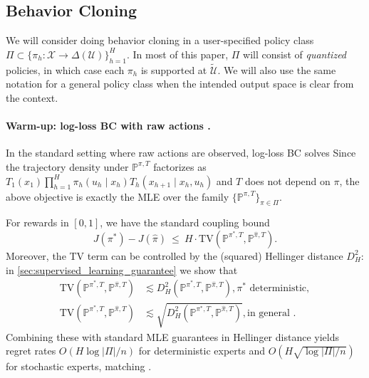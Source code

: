 \documentclass{article}
\newcommand{\arxiv}[1]{\iftoggle{icml}{}{#1}}
\newcommand{\icml}[1]{\iftoggle{icml}{#1}{}}
\let\oldparagraph\paragraph
\renewcommand{\paragraph}[1]{\oldparagraph{#1.}}
\begin{document}
\subsection{Behavior Cloning}\label{sec:bc_intro}
We will consider doing behavior cloning in a user-specified policy class $\Pi \subset \{\pi_h:\mathcal X \to \Delta(\mathcal U)\}_{h=1}^H$. In most of this paper, $\Pi$ will consist of \emph{quantized} policies, in which case each $\pi_h$ is supported at $\tilde {\mathcal U}$. We will also use the same notation for a general policy class when the intended output space is clear from the context.
\paragraph{Warm-up: log-loss BC with raw actions \citep{foster2024behavior}}
In the standard setting where raw actions are observed, log-loss BC solves
\icml{
\begin{align*}
    \hat\pi &\in \argmax_{\pi\in\Pi}\sum_{i=1}^n\sum_{h=1}^H \log \pi_h(u_h^i\mid x_h^i),\\&\{x_{1:H+1}^i,u_{1:H}^i\}_{i=1}^n \sim \mathbb P^{\pi^*,T}.
\end{align*}
}
\arxiv{
\begin{equation*}
    \hat\pi \in \argmax_{\pi\in\Pi}\sum_{i=1}^n\sum_{h=1}^H \log \pi_h(u_h^i\mid x_h^i), \{x_{1:H+1}^i,u_{1:H}^i\}_{i=1}^n \sim \mathbb P^{\pi^*,T}.
\end{equation*}
}
Since the trajectory density under $\mathbb P^{\pi,T}$ factorizes as
$T_1(x_1)\prod_{h=1}^H \pi_h(u_h\mid x_h)T_h(x_{h+1}\mid x_h,u_h)$ and $T$ does not depend on $\pi$,
the above objective is exactly the MLE over the family $\{\mathbb P^{\pi,T}\}_{\pi\in\Pi}$.

For rewards in $[0,1]$, we have the standard coupling bound
\[
J(\pi^*)-J(\hat\pi)\ \le\ H\cdot \mathrm{TV}\left(\mathbb P^{\pi^*,T},\mathbb P^{\hat\pi,T}\right).
\]
Moreover, the TV term can be controlled by the (squared) Hellinger distance $D_H^2$:
in \cref{sec:supervised_learning_guarantee} we show that
\begin{align*}
\mathrm{TV}\left(\mathbb P^{\pi^*,T},\mathbb P^{\hat\pi,T}\right)
&\lesssim D_H^2\left(\mathbb P^{\pi^*,T},\mathbb P^{\hat\pi,T}\right),
\text{$\pi^*$ deterministic},\\
\mathrm{TV}\left(\mathbb P^{\pi^*,T},\mathbb P^{\hat\pi,T}\right)
&\lesssim \sqrt{D_H^2\left(\mathbb P^{\pi^*,T},\mathbb P^{\hat\pi,T}\right)},
\text{in general }.
\end{align*}
Combining these with standard MLE guarantees in Hellinger distance \citep[e.g.,][]{geer2000empirical}
yields regret rates $O(H\log|\Pi|/n)$ for deterministic experts and $O(H\sqrt{\log|\Pi|/n})$ for stochastic experts,
matching \citet{foster2024behavior}.
\end{document}
